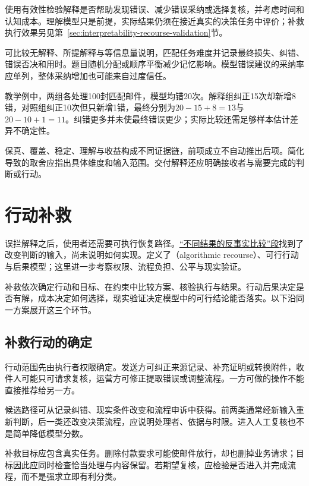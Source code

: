 使用有效性检验解释是否帮助发现错误、减少错误采纳或选择复核，并考虑时间和认知成本。理解模型只是前提，实际结果仍须在接近真实的决策任务中评价；补救执行效果另见第~\ref{sec:interpretability-recourse-validation}节。

可比较无解释、所提解释与等信息量说明，匹配任务难度并记录最终损失、纠错、错误否决和用时。题目随机分配或顺序平衡减少记忆影响。模型错误建议的采纳率应单列，整体采纳增加也可能来自过度信任。

教学例中，两组各处理100封匹配邮件，模型均错20次。解释组纠正15次却新增8错，对照组纠正10次但只新增1错，最终分别为$20-15+8=13$与$20-10+1=11$。纠错更多并未使最终错误更少；实际比较还需足够样本估计差异不确定性。

保真、覆盖、稳定、理解与收益构成不同证据链，前项成立不自动推出后项。简化导致的取舍应指出具体维度和输入范围。交付解释还应明确接收者与需要完成的判断或行动。

\section{行动补救}
\label{sec:interpretability-recourse}

误拦解释之后，使用者还需要可执行恢复路径。\hyperref[sec:interpretability-local-counterfactual]{“不同结果的反事实比较”段}找到了改变判断的输入，尚未说明如何实现。定义了（algorithmic recourse）、可行行动与后果模型；这里进一步考察权限、流程负担、公平与现实验证。

补救依次确定行动和目标、在约束中比较方案、核验执行与结果。行动后果决定是否有解，成本决定如何选择，现实验证决定模型中的可行结论能否落实。以下沿同一方案展开这三个环节。

\subsection{补救行动的确定}
\label{sec:interpretability-recourse-target}

行动范围先由执行者权限确定。发送方可纠正来源记录、补充证明或转换附件，收件人可能只可请求复核，运营方可修正提取错误或调整流程。一方可做的操作不能直接推荐给另一方。

候选路径可从记录纠错、现实条件改变和流程申诉中获得。前两类通常经新输入重新判断，后一类还改变决策流程，应说明处理者、依据与时限。进入人工复核也不是简单降低模型分数。

补救目标应包含真实任务。删除付款要求可能使邮件放行，却也删掉业务请求；目标因此应同时检查恰当处理与内容保留。若期望复核，应检验是否进入并完成流程，而不是强求立即有利分类。

